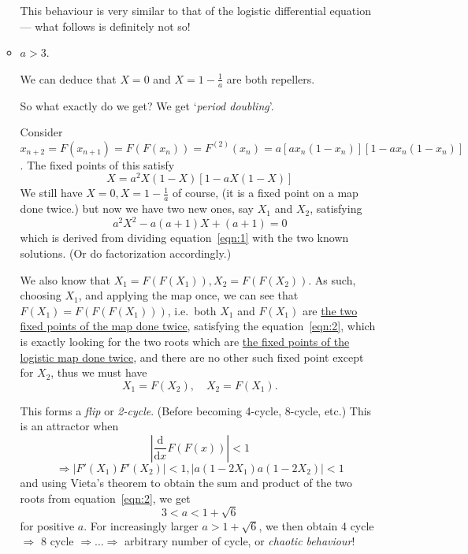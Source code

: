 \documentclass[12pt]{report}
\theoremstyle{definition}
\begin{document}
\begin{ex}
\begin{enumerate}[label = (\alph*)]
\begin{itemize}
            This behaviour is very similar to that of the logistic differential equation
            --- what follows is definitely not so!

        \item $a > 3$.

            We can deduce that $X = 0$ and $X = 1 - \frac{1}{a}$ are both repellers.

            So what exactly do we get?
            We get `\emph{period doubling}'.

            \medskip
            Consider $x_{n + 2} = F(x_{n + 1}) = F(F(x_{n})) = F^{(2)}(x_n)
            = a[ax_n (1 - x_n)][1 - ax_n(1 - x_n)]$.
            The fixed points of this satisfy
            \begin{equation}\label{eqn:1}
                X = a^{2}X(1 - X)[1 - aX(1-X)]
            \end{equation}
            We still have $X = 0, X = 1 - \frac{1}{a}$ of course,
            (it is a fixed point on a map done twice.)
            but now we have two new ones, say $X_1$ and $X_2$, satisfying
            \begin{equation}\label{eqn:2}
                a^{2}X^{2} - a(a+1)X + (a+1) = 0
            \end{equation}
            which is derived from dividing equation~\eqref{eqn:1} with the two known solutions.
            (Or do factorization accordingly.) 

            \medskip
            We also know that $X_1 = F(F(X_1)), X_2 = F(F(X_2))$.
            As such, choosing $X_1$, and applying the map once, we can see that $F(X_1) = F(F(F(X_1)))$,
            i.e.\ both $X_1$ and $F(X_1)$ are 
            \ul{the two fixed points of the map done twice},
            satisfying the equation~\eqref{eqn:2}, which is exactly looking for the two roots which are
            \ul{the fixed points of the logistic map done twice},
            and there are no other such fixed point except for $X_2$,
            thus we must have\[
                X_1 = F(X_2), \quad X_2 = F(X_1).
            \]

            This forms a \emph{flip} or \emph{2-cycle}. (Before becoming 4-cycle, 8-cycle, etc.)
            This is an attractor when\[
                \left|\frac{\mathrm{d}}{\mathrm{d}x} F(F(x)) \right| < 1
            \]\[
                \Rightarrow{} |F'(X_1)F'(X_2)| < 1,
                |a(1 - 2X_1) a(1 - 2X_2)| < 1
            \]and using Vieta's theorem to obtain the sum and product of the two roots
            from equation~\eqref{eqn:2}, we get\[
                3 < a < 1 + \sqrt{6}
            \]
            for positive $a$. For increasingly larger $a > 1 + \sqrt{6}$, we then obtain 4 cycle
            $\Rightarrow{}$ 8 cycle $\Rightarrow{} \ldots \Rightarrow{}$
            arbitrary number of cycle, or \emph{chaotic behaviour}!
    \end{itemize}
    \end{enumerate}
    
\end{ex}
\end{document}
